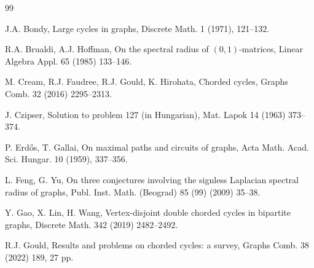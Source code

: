 \documentclass[12pt]{article}
\begin{document}
\begin{thebibliography}{99}

%




%
%
 J.A. Bondy,
Large cycles in graphs,
Discrete Math. 1 (1971), 121--132.

 R.A. Brualdi, A.J. Hoffman,
On the spectral radius of $(0,1)$-matrices,
Linear Algebra Appl. 65 (1985) 133--146.

%


%
%
%

M. Cream, R.J. Faudree,
R.J. Gould, K. Hirohata, Chorded cycles,
Graphs Comb. 32 (2016) 2295--2313.

J. Czipser, Solution to problem 127 (in Hungarian), Mat. Lapok 14 (1963) 373--374.

P. Erd\H{o}s, T. Gallai,
On maximal paths and circuits of graphs,
Acta Math. Acad. Sci. Hungar. 10 (1959), 337--356.


L. Feng, G. Yu, On three conjectures involving the signless Laplacian spectral radius of graphs, Publ.
Inst. Math. (Beograd) 85 (99) (2009)  35--38.


Y. Gao, X. Lin, H. Wang,
Vertex-disjoint double chorded cycles in bipartite graphs,
Discrete Math. 342 (2019) 2482--2492.




 R.J. Gould,
Results and problems on chorded cycles: a survey,
Graphs Comb. 38 (2022) 189, 27 pp.





\end{thebibliography}
\end{document}

